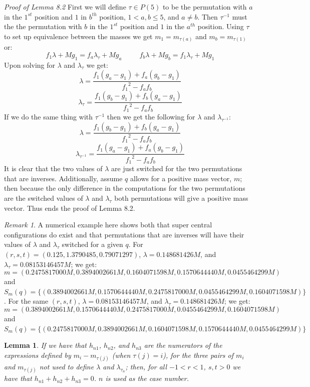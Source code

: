 \documentclass[11pt,leqno]{article}
\newtheorem{lemma}[theorem]{Lemma}
\theoremstyle{definition}
\theoremstyle{remark}
\newtheorem{remark}[theorem]{Remark}
\numberwithin{equation}{section}
\begin{document}
\textit{Proof of Lemma 8.2}
First we will define $\tau \in P(5)$ to be the permutation with $a$ in the $1^{st}$ position and $1$ in $b^{th}$ position, $1<a,b \leq 5$, and $a \neq b$.
Then ${\tau}^{-1}$ must the the permutation with $b$ in the $1^{st}$ position and $1$ in the $a^{th}$ position. Using $\tau$ to set up equivalence between the masses we get $m_1=m_{\tau(a)}$ and $m_b=m_{\tau(1)}$ or:
$$f_1\lambda + Mg_1=f_a\lambda_\tau +Mg_a \hspace{30pt} f_b\lambda +Mg_b=f_1\lambda_\tau +Mg_1$$
Upon solving for $\lambda$ and $\lambda_\tau$ we get:
$$\lambda=\frac{f_1(g_a-g_1)+f_a(g_b-g_1)}{{f_1}^2-f_af_b}$$
$$\lambda_\tau=\frac{f_1(g_b-g_1)+f_b(g_a-g_1)}{{f_1}^2-f_af_b}$$
If we do the same thing with ${\tau}^{-1}$ then we get the following for $\lambda$ and $\lambda_{{\tau}^{-1}}$:
$$\lambda=\frac{f_1(g_b-g_1)+f_b(g_a-g_1)}{{f_1}^2-f_af_b}$$
$$\lambda_{{\tau}^{-1}}=\frac{f_1(g_a-g_1)+f_a(g_b-g_1)}{{f_1}^2-f_af_b}$$
It is clear that the two values of $\lambda$ are just switched for the two permutations that are inverses. 
Additionally, assume $q$ allows for a positive mass vector, $m$; then because the only difference in the computations for the two permutations are the switched values of $\lambda$ and $\lambda_\tau$ both permutations will give a positive mass vector. Thus ends the proof of Lemma 8.2.

\begin{remark}
A numerical example here shows both that super central configurations do exist and that permutations that are inverses will have their values of $\lambda$ and $\lambda_\tau$ switched for a given $q$.
For $(r,s,t)=(0.125,1.3790485, 0.79071297)$, $\lambda=0.148681426M$, and $\lambda_\tau=0.08153146457M$; we get:$$m=(0.2475817000M, 0.3894002661M, 0.1604071598M, 0.1570644440M, 0.0455464299M)$$ and $S_m(q)=\{(0.3894002661M, 0.1570644440M, 0.2475817000M, 0.0455464299M,0.1604071598M)\}$.
For the same $(r,s,t)$, $\lambda=0.08153146457M$, and $\lambda_\tau=0.148681426M$; we get: $$m=(0.3894002661M, 0.1570644440M, 0.2475817000M, 0.0455464299M,0.1604071598M)$$ and $S_m(q)=\{(0.2475817000M, 0.3894002661M, 0.1604071598M, 0.1570644440M, 0.0455464299M)\}$
\end{remark}

\begin{lemma}
If we have that $h_{n1}$, $h_{n2}$, and $h_{n3}$ are the numerators of the expressions defined by $m_i-m_{\tau(j)}$ (when $\tau(j)=i$), for the three pairs of $m_i$ and $m_{\tau(j)}$ not used to define $\lambda$ and $\lambda_\tau_n$; then, for all $-1<r<1$, $s,t>0$ we have that $h_{n1}+h_{n2}+h_{n3}=0$. $n$ is used as the case number.
\end{lemma}
\end{document}
